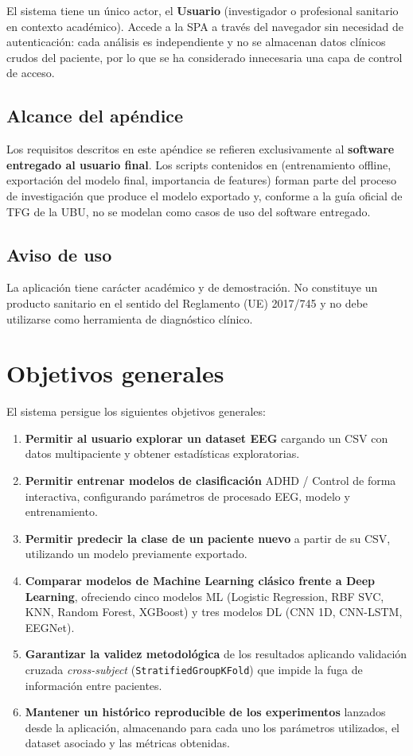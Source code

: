 El sistema tiene un único actor, el \textbf{Usuario} (investigador o profesional sanitario en contexto académico). Accede a la SPA a través del navegador sin necesidad de autenticación: cada análisis es independiente y no se almacenan datos clínicos crudos del paciente, por lo que se ha considerado innecesaria una capa de control de acceso.

\subsection{Alcance del apéndice}

Los requisitos descritos en este apéndice se refieren exclusivamente al \textbf{software entregado al usuario final}. Los scripts contenidos en  (entrenamiento offline, exportación del modelo final, importancia de features) forman parte del proceso de investigación que produce el modelo exportado y, conforme a la guía oficial de TFG de la UBU, no se modelan como casos de uso del software entregado.

\subsection{Aviso de uso}

La aplicación tiene carácter académico y de demostración. No constituye un producto sanitario en el sentido del Reglamento (UE) 2017/745 y no debe utilizarse como herramienta de diagnóstico clínico.

\section{Objetivos generales}

El sistema persigue los siguientes objetivos generales:

\begin{enumerate}
    \item \textbf{Permitir al usuario explorar un dataset EEG} cargando un CSV con datos multipaciente y obtener estadísticas exploratorias.
    \item \textbf{Permitir entrenar modelos de clasificación} ADHD / Control de forma interactiva, configurando parámetros de procesado EEG, modelo y entrenamiento.
    \item \textbf{Permitir predecir la clase de un paciente nuevo} a partir de su CSV, utilizando un modelo previamente exportado.
    \item \textbf{Comparar modelos de Machine Learning clásico frente a Deep Learning}, ofreciendo cinco modelos ML (Logistic Regression, RBF SVC, KNN, Random Forest, XGBoost) y tres modelos DL (CNN 1D, CNN-LSTM, EEGNet).
    \item \textbf{Garantizar la validez metodológica} de los resultados aplicando validación cruzada \emph{cross-subject} (\texttt{StratifiedGroupKFold}) que impide la fuga de información entre pacientes.
    \item \textbf{Mantener un histórico reproducible de los experimentos} lanzados desde la aplicación, almacenando para cada uno los parámetros utilizados, el dataset asociado y las métricas obtenidas.
\end{enumerate}

